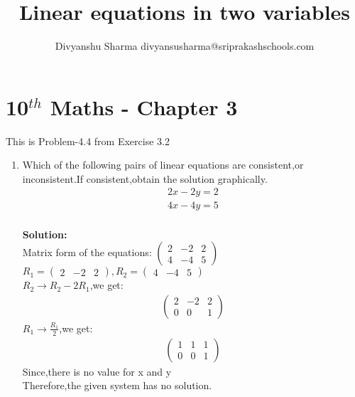 \documentclass[12pt]{article}
\title{Linear equations in two variables}
\author{Divyanshu Sharma {divyansusharma@sriprakashschools.com}}
\newcommand{\myvec}[1]{\ensuremath{\begin{pmatrix}#1\end{pmatrix}}}
\newcommand{\solution}{\noindent \textbf{Solution: }}
\begin{document}
\maketitle
\section*{10$^{th}$ Maths - Chapter 3}
This is Problem-4.4 from Exercise 3.2
\begin{enumerate}
\item Which of the following pairs of linear equations are consistent,or inconsistent.If consistent,obtain the solution graphically.\\
\begin{align}
2x-2y=2\\
4x-4y=5\\
\end{align}

\solution \\
Matrix form of the equations:
$\myvec{2 & -2 & 2\\4 & -4 & 5}$\\
$R_1=\myvec{2 & -2 & 2},R_2=\myvec{4 & -4 & 5}$\\
$R_2\rightarrow R_2 - 2R_1$,we get:
\begin{align}
\myvec{2 & -2 & 2\\0 & 0 & 1}
\end{align}
$R_1\rightarrow \frac{R_1}{2}$,we get:
\begin{align}
\myvec{1 & 1 & 1\\0 & 0 & 1}
\end{align}
Since,there is no value for x and y\\
Therefore,the given system has no solution.
\end{enumerate}
\end{document}
